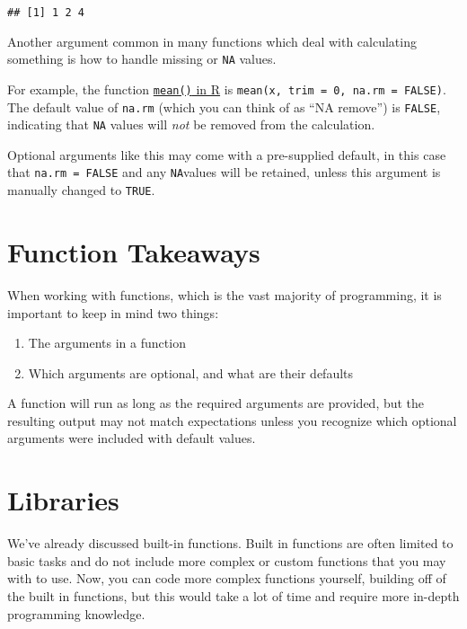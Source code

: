 \documentclass[
]{book}
\providecommand{\tightlist}{%
  \setlength{\itemsep}{0pt}\setlength{\parskip}{0pt}}
\begin{document}
\begin{verbatim}
## [1] 1 2 4
\end{verbatim}

Another argument common in many functions which deal with calculating something is how to handle missing or \texttt{NA} values.

For example, the function \href{https://search.r-project.org/R/refmans/base/html/mean.html}{\texttt{mean()} in R} is \texttt{mean(x,\ trim\ =\ 0,\ na.rm\ =\ FALSE)}. The default value of \texttt{na.rm} (which you can think of as ``NA remove'') is \texttt{FALSE}, indicating that \texttt{NA} values will \emph{not} be removed from the calculation.

Optional arguments like this may come with a pre-supplied default, in this case that \texttt{na.rm\ =\ FALSE} and any \texttt{NA}values will be retained, unless this argument is manually changed to \texttt{TRUE}.\\

\section{Function Takeaways}\label{function-takeaways}

When working with functions, which is the vast majority of programming, it is important to keep in mind two things:

\begin{enumerate}
\def\labelenumi{\arabic{enumi}.}
\tightlist
\item
  The arguments in a function
\item
  Which arguments are optional, and what are their defaults
\end{enumerate}

A function will run as long as the required arguments are provided, but the resulting output may not match expectations unless you recognize which optional arguments were included with default values.

\section{Libraries}\label{libraries}

We've already discussed built-in functions. Built in functions are often limited to basic tasks and do not include more complex or custom functions that you may with to use. Now, you can code more complex functions yourself, building off of the built in functions, but this would take a lot of time and require more in-depth programming knowledge.
\end{document}
